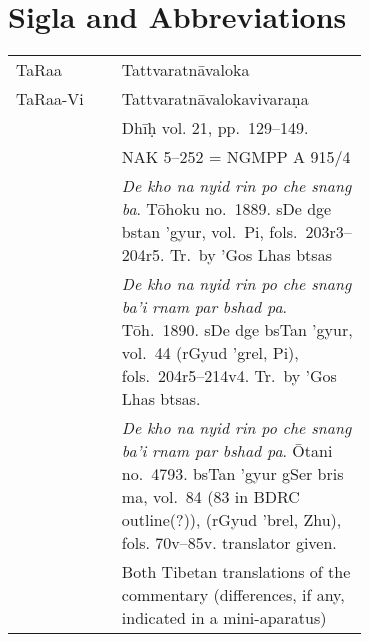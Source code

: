 \documentclass[12pt]{book}
\begin{document}
\newpage
\section*{Sigla and Abbreviations}
\noindent\begin{longtable}{ l p{0.7\linewidth} }
	\noindent TaRaa & Tattvaratnāvaloka\\

	\noindent TaRaa-Vi & Tattvaratnāvalokavivaraṇa\\

	\noindent \EDD\ & Dhīḥ vol. 21, pp.\ 129–149.\\

	\noindent \MS\ & NAK 5–252 = NGMPP A 915/4\\

	\noindent \TM & \emph{De kho na nyid rin po che snang ba}. Tōhoku no.\ 1889. sDe dge bstan 'gyur, vol.\ Pi, fols.\ 203r3–204r5. Tr.\ by 'Gos Lhas btsas\\

	\noindent \TVA & \emph{De kho na nyid rin po che snang ba'i rnam par bshad pa}.  Tōh.\ 1890. sDe dge bsTan 'gyur, vol.\ 44 (rGyud 'grel, Pi), fols.\ 204r5–214v4. Tr.\ by 'Gos Lhas btsas.\\

	\noindent \TVB & \emph{De kho na nyid rin po che snang ba'i rnam par bshad pa}. Ōtani no.\ 4793. bsTan 'gyur gSer bris ma, vol.\ 84 (83 in BDRC outline(?)), (rGyud 'brel, Zhu), fols. 70v–85v. translator given.\\

	\noindent \TIB & Both Tibetan translations of the commentary (differences, if any, indicated in a mini-aparatus)
\end{longtable}
\end{document}
